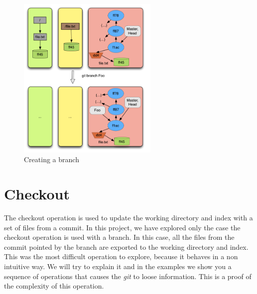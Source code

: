 \begin{figure}[!t]
   \centering
   \includegraphics[width=0.6\textwidth]{images/branch.png}
   \caption{Creating a branch}\label{fig:branch}
\end{figure}

\section{Checkout}
The checkout operation is used to update the working directory and
index with a set of files from a commit. In this project, we have
explored only the case the checkout operation is used with a branch.
In this case, all the files from the commit pointed by the branch are
exported to the working directory and index. This was the most
difficult operation to explore, because it behaves in a non intuitive
way. We will try to explain it and in the examples we show you a
sequence of operations that causes the \emph{git} to loose
information. This is a proof of the complexity of this operation.

